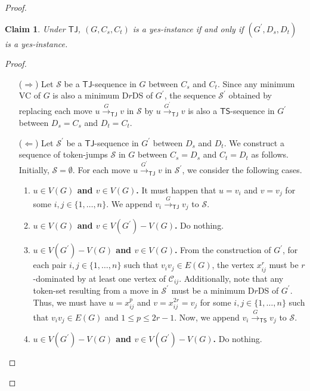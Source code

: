 \documentclass[a4paper]{article}
\theoremstyle{plain}
\newtheorem{claim}{Claim}[theorem]
\theoremstyle{definition}
\newcommand{\sfTS}{{\mathsf{TS}}} %
\newcommand{\sfTJ}{{\mathsf{TJ}}} %
\newcommand{\sfR}{{\mathsf{R}}} %
\newcommand{\calS}{{\mathcal{S}}}
\newcommand{\reconf}[2][\sfR]{\overset{#2}{\longrightarrow}_{#1}} %
\begin{document}
\begin{proof}
	\begin{claim}\label{clm:TJ-planar}
		Under $\sfTJ$, $(G, C_s, C_t)$  is a yes-instance if and only if $(G^\prime, D_s, D_t)$ is a yes-instance.
	\end{claim}
	\begin{proof}
		\begin{itemize}
			\item[($\Rightarrow$)] Let $\calS$ be a $\sfTJ$-sequence in $G$ between $C_s$ and $C_t$.
			Since any minimum VC of $G$ is also a minimum D$r$DS of $G^\prime$, the sequence $\calS^\prime$ obtained by replacing each move $u \reconf[\sfTJ]{G} v$ in $\calS$ by $u \reconf[\sfTJ]{G^\prime} v$ is also a $\sfTS$-sequence in $G^\prime$ between $D_s = C_s$ and $D_t = C_t$.
			
			\item[($\Leftarrow$)] Let $\calS^\prime$ be a $\sfTJ$-sequence in $G^\prime$ between $D_s$ and $D_t$.
			We construct a sequence of token-jumps $\calS$ in $G$ between $C_s = D_s$ and $C_t = D_t$ as follows.
			Initially, $\calS = \emptyset$.
			For each move $u \reconf[\sfTJ]{G^\prime} v$ in $\calS^\prime$, we consider the following cases.
			\begin{enumerate}[{\bf {Case} 1:}]
				\item {\bf $u \in V(G)$ and $v \in V(G)$.} It must happen that $u = v_i$ and $v = v_j$ for some $i, j \in \{1, \dots, n\}$. We append $v_i \reconf[\sfTJ]{G} v_j$ to $\calS$.
				
				\item {\bf $u \in V(G)$ and $v \in V(G^\prime) - V(G)$.} Do nothing.
				
				\item {\bf $u \in V(G^\prime) - V(G)$ and $v \in V(G)$.} From the construction of $G^\prime$, for each pair $i, j \in \{1, \dots, n\}$ such that $v_iv_j \in E(G)$, the vertex $x_{ij}^r$ must be $r$-dominated by at least one vertex of $\mathcal{C}_{ij}$.
				Additionally, note that any token-set resulting from a move in $\calS^\prime$ must be a minimum D$r$DS of $G^\prime$.
				Thus, we must have $u = x_{ij}^p$ and $v = x_{ij}^{2r} = v_j$ for some $i, j \in \{1, \dots, n\}$ such that $v_iv_j \in E(G)$ and $1 \leq p \leq 2r-1$.	
				Now, we append $v_i \reconf[\sfTS]{G} v_j$ to $\calS$.
				
				\item {\bf $u \in V(G^\prime) - V(G)$ and $v \in V(G^\prime) - V(G)$.} Do nothing.
			\end{enumerate}
			

\end{itemize}
\end{proof}
\end{proof}
\end{document}
